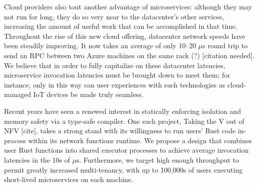 Cloud providers also tout another advantage of microservices: although they may not run for long, they do so very near to the datacenter's other services, increasing the amount of useful work that can be accomplished in that time.
Throughout the rise of this new cloud offering, datacenter network speeds have been steadily improving.
It now takes an average of only 10--20 $\mu$s round trip to send an RPC between two Azure machines on the same rack (?) [citation needed].
We believe that in order to fully capitalize on these datacenter latencies, microservice invocation latencies must be brought down to meet them; for instance, only in this way can user experiences with such technologies as cloud-managed IoT devices be made truly seamless.

Recent years have seen a renewed interest in statically enforcing isolation and memory safety via a type-safe compiler.
One such project, Taking the V out of NFV [cite], takes a strong stand with its willingness to run users' Rust code in-process within its network functions runtime.
We propose a design that combines user Rust functions into shared executor processes to achieve average invocation latencies in the 10s of $\mu$s.
Furthermore, we target high enough throughput to permit greatly increased multi-tenancy, with up to 100,000s of users executing short-lived microservices on each machine.
